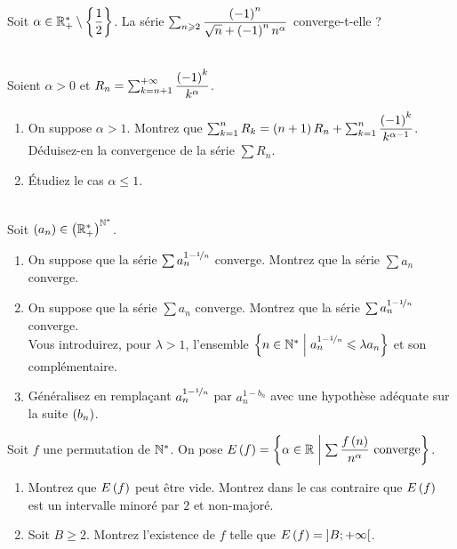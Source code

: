 \begin{exo}~\\
Soit \(\alpha\in\mathbb{R}_+^*\setminus\left\lbrace\dfrac{1}{2}\right\rbrace\). La série \(\sum_{n\geqslant2}\dfrac{\left(-1\right)^n}{\sqrt{n}+\left(-1\right)^nn^\alpha}\) converge-t-elle ?
\end{exo}



\begin{exo}~\\
Soient \(\alpha>0\) et \(R_n=\sum_{k=n+1}^{+\infty}\dfrac{\left(-1\right)^k}{k^\alpha}\).

\begin{enumerate}
    \item On suppose \(\alpha>1\). Montrez que \(\sum_{k=1}^nR_k=\left(n+1\right)R_n+\sum_{k=1}^n\dfrac{\left(-1\right)^k}{k^{\alpha-1}}\). Déduisez-en la convergence de la série \(\sum R_n\). \\
    \item Étudiez le cas \(\alpha\leq1\).
\end{enumerate}
\end{exo}



\begin{exo}~\\
Soit \(\left(a_n\right)\in\left(\mathbb{R}_+^*\right)^{\mathbb{N}^*}\).

\begin{enumerate}
    \item On suppose que la série \(\sum a_n^{1-\nicefrac{1}{n}}\) converge. Montrez que la série \(\sum a_n\) converge. \\
    \item On suppose que la série \(\sum a_n\) converge. Montrez que la série \(\sum a_n^{1-\nicefrac{1}{n}}\) converge. \\ Vous introduirez, pour \(\lambda>1\), l'ensemble \(\left\lbrace n\in\mathbb{N}^*\;\middle|\; a_n^{1-\nicefrac{1}{n}}\leqslant\lambda a_n\right\rbrace\) et son complémentaire. \\
    \item Généralisez en remplaçant \(a_n^{1-\nicefrac{1}{n}}\) par \(a_n^{1-b_n}\) avec une hypothèse adéquate sur la suite \(\left(b_n\right)\).
\end{enumerate}
\end{exo}



\begin{exo}
Soit \(f\) une permutation de \(\mathbb{N}^*\). On pose \(E\left(f\right)=\left\lbrace\alpha\in\mathbb{R}\;\middle|\;\sum\dfrac{f\left(n\right)}{n^\alpha}\text{ converge}\right\rbrace\).

\begin{enumerate}
    \item Montrez que \(E\left(f\right)\) peut être vide. Montrez dans le cas contraire que \(E\left(f\right)\) est un intervalle minoré par \(2\) et non-majoré. \\
    \item Soit \(B\geq2\). Montrez l'existence de \(f\) telle que \(E\left(f\right)=\left]B;+\infty\right[\).
\end{enumerate}
\end{exo}



